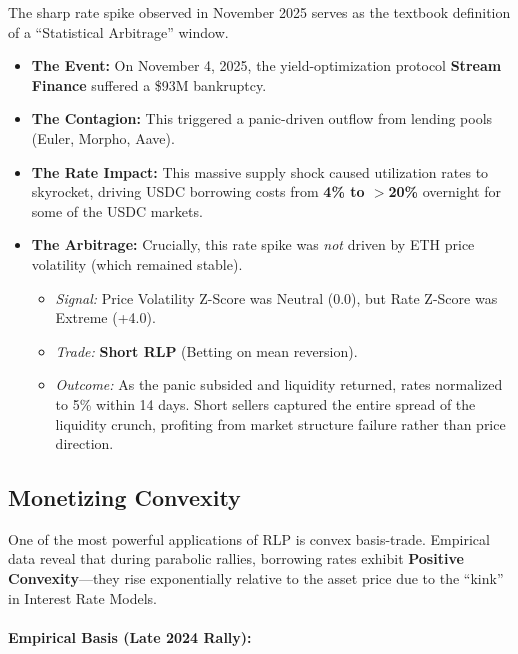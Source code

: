 \documentclass[12pt]{article}
\begin{document}
The sharp rate spike observed in November 2025 serves as the textbook definition of a ``Statistical Arbitrage'' window.

\begin{itemize}
    \item \textbf{The Event:} On November 4, 2025, the yield-optimization protocol \textbf{Stream Finance} suffered a \$93M bankruptcy.
    \item \textbf{The Contagion:} This triggered a panic-driven outflow from lending pools (Euler, Morpho, Aave).
    \item \textbf{The Rate Impact:} This massive supply shock caused utilization rates to skyrocket, driving USDC borrowing costs from \textbf{4\% to $>$20\%} overnight for some of the USDC markets.
    \item \textbf{The Arbitrage:} Crucially, this rate spike was \emph{not} driven by ETH price volatility (which remained stable).
    \begin{itemize}
        \item \emph{Signal:} Price Volatility Z-Score was Neutral (0.0), but Rate Z-Score was Extreme (+4.0).
        \item \emph{Trade:} \textbf{Short RLP} (Betting on mean reversion).
        \item \emph{Outcome:} As the panic subsided and liquidity returned, rates normalized to 5\% within 14 days. Short sellers captured the entire spread of the liquidity crunch, profiting from market structure failure rather than price direction.
    \end{itemize}
\end{itemize}

\subsection{Monetizing Convexity}

One of the most powerful applications of RLP is convex basis-trade. Empirical data reveal that during parabolic rallies, borrowing rates exhibit \textbf{Positive Convexity}---they rise exponentially relative to the asset price due to the ``kink'' in Interest Rate Models.

\paragraph{Empirical Basis (Late 2024 Rally):}
\end{document}
